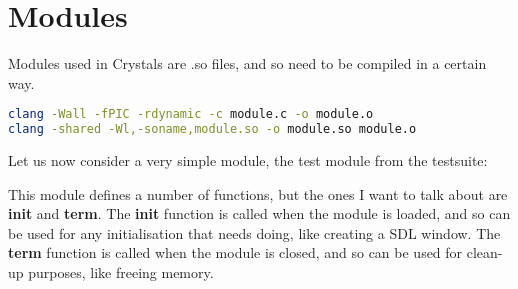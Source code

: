\documentclass[12pt,a4paper]{article}
\begin{document}
\section{Modules}

Modules used in Crystals are .so files, and so need to be compiled in a certain way.

\begin{lstlisting}[language=bash]
clang -Wall -fPIC -rdynamic -c module.c -o module.o
clang -shared -Wl,-soname,module.so -o module.so module.o
\end{lstlisting}

Let us now consider a very simple module, the test module from the testsuite:



This module defines a number of functions, but the ones I want to talk about are \textbf{init} and \textbf{term}. The \textbf{init} function is called when the module is loaded, and so can be used for any initialisation that needs doing, like creating a SDL window. The \textbf{term} function is called when the module is closed, and so can be used for clean-up purposes, like freeing memory.
\end{document}
